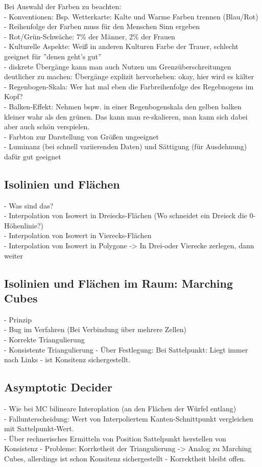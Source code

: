 \documentclass{article}
\begin{document}
\noindent Bei Auswahl der Farben zu beachten:\\
- Konventionen: Bsp. Wetterkarte: Kalte und Warme Farben trennen (Blau/Rot)\\
- Reihenfolge der Farben muss für den Menschen Sinn ergeben\\
- Rot/Grün-Schwäche: 7\% der Männer, 2\% der Frauen\\
- Kulturelle Aspekte: Weiß in anderen Kulturen Farbe der Trauer, schlecht geeignet für ''denen geht's gut''\\
- diskrete Übergänge kann man auch Nutzen um Grenzüberschreitungen deutlicher zu machen: Übergänge explizit hervorheben: okay, hier wird es kälter\\
- Regenbogen-Skala: Wer hat mal eben die Farbreihenfolge des Regebnogens im Kopf?\\
- Balken-Effekt: Nehmen bspw. in einer Regenbogenskala den gelben balken kleiner wahr als den grünen. Das kann man re-skalieren, man kann sich dabei aber auch schön verspielen.\\

\noindent - Farbton zur Darstellung von Größen ungeeignet\\
- Luminanz (bei schnell variierenden Daten) und Sättigung (für Ausdehnung) dafür gut geeignet 
\subsection{Isolinien und Flächen}
- Was sind das?\\
- Interpolation von Isowert in Dreiecks-Flächen (Wo schneidet ein Dreieck die 0-Höhenlinie?)\\
- Interpolation von Isowert in Vierecks-Flächen\\
- Interpolation von Isowert in Polygone -> In Drei-oder Vierecke zerlegen, dann weiter\\

\subsection{Isolinien und Flächen im Raum: Marching Cubes}
- Prinzip\\
- Bug im Verfahren (Bei Verbindung über mehrere Zellen)\\
- Korrekte Triangulierung\\ 
- Konsistente Triangulierung - Über Festlegung: Bei Sattelpunkt: Liegt immer nach Links - ist Konsitenz sichergestellt.

\subsection{Asymptotic Decider}
- Wie bei MC bilineare Interoplation (an den Flächen der Würfel entlang)\\
- Fallunterscheidung: Wert von Interpoliertem Kanten-Schnittpunkt vergleichen mit Sattelpunkt-Wert.\\
- Über rechnerisches Ermitteln von Position Sattelpunkt herstellen von Konsistenz
- Probleme: Korrketheit der Triangulierung -> Analog zu Marching Cubes, allerdings ist schon Konsitenz sichergestellt - Korrektheit bleibt offen.\\
\end{document}
